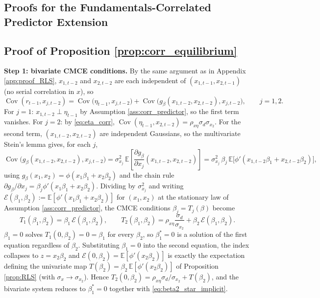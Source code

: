 \subsection{Proofs for the Fundamentals-Correlated Predictor Extension}\label{app:proofs_corr}

\subsection{Proof of Proposition \ref{prop:corr_equilibrium}}\label{app:proof_RLS_corr}

\textbf{Step 1: bivariate CMCE conditions.} By the same argument as in Appendix \ref{app:proof_RLS},
$x_{1,t-2}$ and $x_{2,t-2}$ are each independent of $(x_{1,t-1},x_{2,t-1})$ (no serial correlation in
$x$), so
\[
\operatorname{Cov}(r_{t-1},x_{j,t-2}) = \operatorname{Cov}\bigl(\eta_{t-1},x_{j,t-2}\bigr) +
\operatorname{Cov}\bigl(g_\beta(x_{1,t-2},x_{2,t-2}),x_{j,t-2}\bigr), \qquad j=1,2.
\]
For $j=1$: $x_{1,t-2}\perp\eta_{t-1}$ by Assumption \ref{ass:corr_predictor}, so the first term vanishes.
For $j=2$: by \eqref{eq:eta_corr}, $\operatorname{Cov}(\eta_{t-1},x_{2,t-2})=\rho_{x\eta}\sigma_d\sigma_{x_2}$.
For the second term, $(x_{1,t-2},x_{2,t-2})$ are independent Gaussians, so the multivariate Stein's
lemma gives, for each $j$,
\[
\operatorname{Cov}\bigl(g_\beta(x_{1,t-2},x_{2,t-2}),x_{j,t-2}\bigr) = \sigma_{x_j}^2\,
\mathbb E\!\left[\frac{\partial g_\beta}{\partial x_j}(x_{1,t-2},x_{2,t-2})\right]
= \sigma_{x_j}^2\,\beta_j\,\mathbb E\bigl[\phi'(x_{1,t-2}\beta_1+x_{2,t-2}\beta_2)\bigr],
\]
using $g_\beta(x_1,x_2)=\phi(x_1\beta_1+x_2\beta_2)$ and the chain rule $\partial g_\beta/\partial
x_j=\beta_j\phi'(x_1\beta_1+x_2\beta_2)$. Dividing by $\sigma_{x_j}^2$ and writing
$\mathcal E(\beta_1,\beta_2):=\mathbb E[\phi'(x_1\beta_1+x_2\beta_2)]$ for $(x_1,x_2)$ at the stationary
law of Assumption \ref{ass:corr_predictor}, the CMCE conditions $\beta_j=T_j(\beta)$ become
\begin{equation}\label{eq:T1T2}
T_1(\beta_1,\beta_2)=\beta_1\,\mathcal E(\beta_1,\beta_2), \qquad
T_2(\beta_1,\beta_2)=\rho_{x\eta}\frac{\sigma_d}{\sigma_{x_2}}+\beta_2\,\mathcal E(\beta_1,\beta_2).
\end{equation}
$\beta_1=0$ solves $T_1(0,\beta_2)=0=\beta_1$ for every $\beta_2$, so $\beta_1^*=0$ is a solution of the
first equation regardless of $\beta_2$. Substituting $\beta_1=0$ into the second equation, the index
collapses to $z=x_2\beta_2$ and $\mathcal E(0,\beta_2)=\mathbb E[\phi'(x_2\beta_2)]$ is exactly the
expectation defining the univariate map $T(\beta_2)=\beta_2\,\mathbb E[\phi'(x_2\beta_2)]$ of
Proposition \ref{prop:RLS} (with $\sigma_x\to\sigma_{x_2}$). Hence $T_2(0,\beta_2)=\rho_{x\eta}
\sigma_d/\sigma_{x_2}+T(\beta_2)$, and the bivariate system reduces to $\beta_1^*=0$ together with
\eqref{eq:beta2_star_implicit}.

